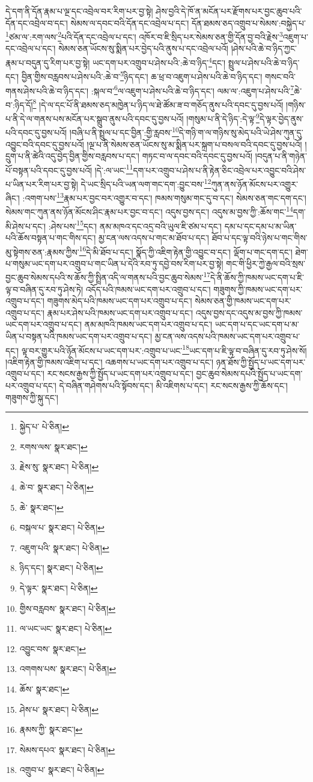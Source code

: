 དེ་དག་ནི་དོན་རྣམ་པ་ལྔ་དང་འབྲེལ་བར་རིག་པར་བྱ་སྟེ། ཤེས་བྱའི་དེ་ཁོ་ན་མངོན་པར་རྫོགས་པར་བྱང་ཆུབ་པའི་དོན་དང་འབྲེལ་བ་དང་། སེམས་ལ་དབང་བའི་དོན་དང་འབྲེལ་པ་དང་། དོན་ཐམས་ཅད་འགྲུབ་པ་སེམས་:བསྐྱེད་པ་\footnote{སྐྱེད་པ་  པེ་ཅིན། }ཙམ་ལ་:རག་ལས་\footnote{རགས་ལས་  སྣར་ཐང་། }པའི་དོན་དང་འབྲེལ་པ་དང་། འཁོར་བ་ཇི་སྲིད་པར་སེམས་ཅན་གྱི་དོན་བྱ་བའི་རྗེས་\footnote{རྗེས་སུ་  སྣར་ཐང་།  པེ་ཅིན། }འཇུག་པ་དང་འབྲེལ་པ་དང་། སེམས་ཅན་ཡོངས་སུ་སྨིན་པར་བྱེད་པའི་ནུས་པ་དང་འབྲེལ་པའོ། །ཤེས་པའི་ཆེ་བ་ཉིད་ཀྱང་རྣམ་པ་བདུན་དུ་རིག་པར་བྱ་སྟེ། ཡང་དག་པར་འགྲུབ་པ་ཤེས་པའི་:ཆེ་བ་ཉིད་\footnote{ཆེ་བ་  སྣར་ཐང་།  པེ་ཅིན། }དང་། སྤྲུལ་པ་ཤེས་པའི་ཆེ་བ་ཉིད་དང་། བྱིན་གྱིས་བརླབས་པ་ཤེས་པའི་:ཆེ་བ་\footnote{ཆེ་  སྣར་ཐང་། }ཉིད་དང་། ཆ་ཕྲ་བ་འཇུག་པ་ཤེས་པའི་ཆེ་བ་ཉིད་དང་། གསང་བའི་གནས་ཤེས་པའི་ཆེ་བ་ཉིད་དང་། :སྐལ་བ་\footnote{བསྐལ་པ་  སྣར་ཐང་།  པེ་ཅིན། }ལ་འཇུག་པ་ཤེས་པའི་ཆེ་བ་ཉིད་དང་། ལམ་ལ་:འཇུག་པ་ཤེས་པའི་\footnote{འཇུག་པའི་  སྣར་ཐང་།  པེ་ཅིན། }ཆེ་བ་:ཉིད་དོ།\footnote{ཉིད་དང་།  སྣར་ཐང་།  པེ་ཅིན། } །དེ་ལ་དང་པོ་ནི་ཐམས་ཅད་མཁྱེན་པ་ཉིད་ལ་ཐེ་ཚོམ་ཟ་བ་གཅོད་ནུས་པའི་དབང་དུ་བྱས་པའོ། །གཉིས་པ་ནི་དེ་ལ་གནས་པས་མངོན་པར་སྒྲུབ་ནུས་པའི་དབང་དུ་བྱས་པའོ། །གསུམ་པ་ནི་དེ་ཉིད་:དེ་ལྟ་\footnote{དེ་ལྟར་  སྣར་ཐང་།  པེ་ཅིན། }དེ་ལྟར་བྱེད་ནུས་པའི་དབང་དུ་བྱས་པའོ། །བཞི་པ་ནི་སྤྲུལ་པ་དང་བྱིན་:གྱི་རླབས་\footnote{གྱིས་བརླབས་  སྣར་ཐང་།  པེ་ཅིན། }དེ་གཉི་ག་ལ་གཉིས་སུ་མེད་པའི་ཡེ་ཤེས་ཀུན་དུ་འབྱུང་བའི་དབང་དུ་བྱས་པའོ། །ལྔ་པ་ནི་སེམས་ཅན་ཡོངས་སུ་མ་སྨིན་པར་སྐྲག་པ་བསལ་བའི་དབང་དུ་བྱས་པའོ། །དྲུག་པ་ནི་ཚེའི་འདུ་བྱེད་བྱིན་གྱིས་བརླབས་པ་དང་། གཏང་བ་ལ་དབང་བའི་དབང་དུ་བྱས་པའོ། །བདུན་པ་ནི་གཉེན་པོ་བསྟན་པའི་དབང་དུ་བྱས་པའོ། །དེ་:ལ་ཡང་\footnote{ལ་ཡང་ཡང་  སྣར་ཐང་།  པེ་ཅིན། }དག་པར་འགྲུབ་པ་ཤེས་པ་ནི་རྟེན་ཅིང་འབྲེལ་པར་འབྱུང་བའི་ཤེས་པ་ཡིན་པར་རིག་པར་བྱ་སྟེ། དེ་ཡང་སྲིད་པའི་ཡན་ལག་གང་དག་:བྱུང་བས་\footnote{འབྱུང་བས་  སྣར་ཐང་། }ཀུན་ནས་ཉོན་མོངས་པར་འགྱུར་ཞིང་། :འགག་པས་\footnote{འགགས་པས་  སྣར་ཐང་།  པེ་ཅིན། }རྣམ་པར་བྱང་བར་འགྱུར་བ་དང་། ཁམས་གསུམ་གང་དུ་བ་དང་། སེམས་ཅན་གང་དག་དང་། སེམས་གང་ཀུན་ནས་ཉོན་མོངས་ཤིང་རྣམ་པར་བྱང་བ་དང་། འདུས་བྱས་དང་། འདུས་མ་བྱས་ཀྱི་:ཆོས་གང་\footnote{ཆོས་  སྣར་ཐང་། }དག་མི་ཤེས་པ་དང་། :ཤེས་པས་\footnote{ཤེས་པ་  སྣར་ཐང་།  པེ་ཅིན། }དང་། ནམ་མཁའ་དང་འདྲ་བའི་ཡུལ་ཇི་ཙམ་པ་དང་། དམ་པ་དང་དམ་པ་མ་ཡིན་པའི་ཆོས་བསྟན་པ་གང་གིས་དང་། མྱ་ངན་ལས་འདས་པ་གང་མ་ཐོབ་པ་དང་། ཐོབ་པ་དང་ལྟ་བའི་ཉེས་པ་གང་གིས་མུ་སྟེགས་ཅན་:རྣམས་ཀྱིས་\footnote{རྣམས་ཀྱི་  སྣར་ཐང་། }དེ་མི་ཐོབ་པ་དང་། སྣོད་ཀྱི་འཇིག་རྟེན་གྱི་འབྱུང་བ་དང་། ལྡོག་པ་གང་དག་དང་། ཐེག་པ་གསུམ་ཡང་དག་པར་འགྲུབ་པ་གང་ཡིན་པ་དེའི་རབ་ཏུ་དབྱེ་བས་རིག་པར་བྱ་སྟེ། གང་གི་ཕྱིར་ཀྱེ་རྒྱལ་བའི་སྲས་བྱང་ཆུབ་སེམས་དཔའི་ས་ཆོས་ཀྱི་སྤྲིན་འདི་ལ་གནས་པའི་བྱང་ཆུབ་སེམས་\footnote{སེམས་དཔའ་  སྣར་ཐང་།  པེ་ཅིན། }དེ་ནི་ཆོས་ཀྱི་ཁམས་ཡང་དག་པ་ཇི་ལྟ་བ་བཞིན་དུ་རབ་ཏུ་ཤེས་ཏེ། འདོད་པའི་ཁམས་ཡང་དག་པར་འགྲུབ་པ་དང་། གཟུགས་ཀྱི་ཁམས་ཡང་དག་པར་འགྲུབ་པ་དང་། གཟུགས་མེད་པའི་ཁམས་ཡང་དག་པར་འགྲུབ་པ་དང་། སེམས་ཅན་གྱི་ཁམས་ཡང་དག་པར་འགྲུབ་པ་དང་། རྣམ་པར་ཤེས་པའི་ཁམས་ཡང་དག་པར་འགྲུབ་པ་དང་། འདུས་བྱས་དང་འདུས་མ་བྱས་ཀྱི་ཁམས་ཡང་དག་པར་འགྲུབ་པ་དང་། ནམ་མཁའི་ཁམས་ཡང་དག་པར་འགྲུབ་པ་དང་། ཡང་དག་པ་དང་ཡང་དག་པ་མ་ཡིན་པ་བསྟན་པའི་ཁམས་ཡང་དག་པར་འགྲུབ་པ་དང་། མྱ་ངན་ལས་འདས་པའི་ཁམས་ཡང་དག་པར་འགྲུབ་པ་དང་། ལྟ་བར་གྱུར་པའི་ཉོན་མོངས་པ་ཡང་དག་པར་:འགྲུབ་པ་ཡང་\footnote{འགྲུབ་པ་  སྣར་ཐང་།  པེ་ཅིན། }ཡང་དག་པ་ཇི་ལྟ་བ་བཞིན་དུ་རབ་ཏུ་ཤེས་སོ། །འཇིག་རྟེན་གྱི་ཁམས་འཇིག་པ་དང་། འཆགས་པ་ཡང་དག་པར་འགྲུབ་པ་དང་། ཉན་ཐོས་ཀྱི་སྤྱོད་པ་ཡང་དག་པར་འགྲུབ་པ་དང་། རང་སངས་རྒྱས་ཀྱི་སྤྱོད་པ་ཡང་དག་པར་འགྲུབ་པ་དང་། བྱང་ཆུབ་སེམས་དཔའི་སྤྱོད་པ་ཡང་དག་པར་འགྲུབ་པ་དང་། དེ་བཞིན་གཤེགས་པའི་སྟོབས་དང་། མི་འཇིགས་པ་དང་། རང་སངས་རྒྱས་ཀྱི་ཆོས་དང་། གཟུགས་ཀྱི་སྐུ་དང་། 
